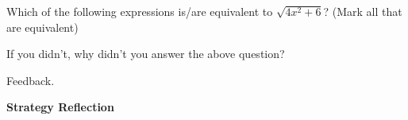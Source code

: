 \documentclass{ximera}
\begin{document}
\begin{problem}
\begin{problem}
    Which of the following expressions is/are equivalent to $\sqrt{4x^2 +6}$? (Mark all that are equivalent)
    

        
  \begin{selectAll}
      

  \end{selectAll}
  
\end{problem}

\begin{question}
  
    If you didn't, why didn't you answer the above question?
  
  \begin{multipleChoice}
      
      \begin{feedback}[attempt]
      Feedback.
      \end{feedback}
      
  \end{multipleChoice}
  
\end{question}

\end{problem}


\begin{center} \textbf{Strategy Reflection} \end{center}
\end{document}
